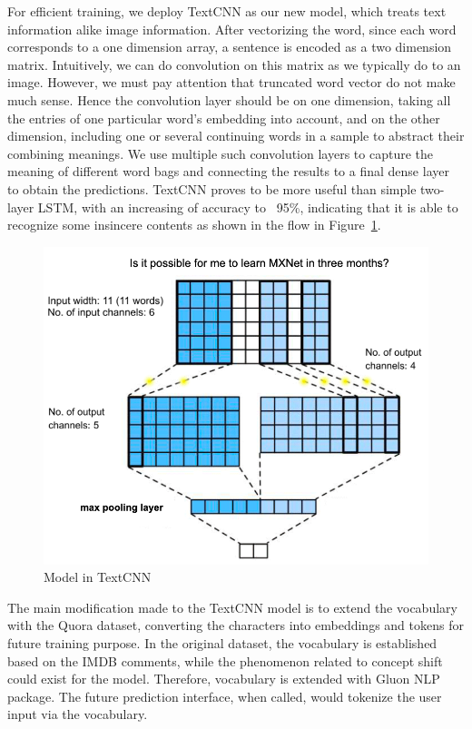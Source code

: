 \documentclass{article}
\begin{document}
For efficient training, we deploy TextCNN as our new model, which treats text information alike image information. After vectorizing the word, since each word corresponds to a one dimension array, a sentence is encoded as a two dimension matrix. Intuitively, we can do convolution on this matrix as we typically do to an image. However, we must pay attention that truncated word vector do not make much sense. Hence the convolution layer should be on one dimension, taking all the entries of one particular word's embedding into account, and on the other dimension, including one or several continuing words in a sample to abstract their combining meanings. We use multiple such convolution layers to capture the meaning of different word bags and connecting the results to a final dense layer to obtain the predictions. TextCNN proves to be more useful than simple two-layer LSTM, with an increasing of accuracy to ~95\%, indicating that it is able to recognize some insincere contents as shown in the flow in Figure~\ref{fig:flow}. 

\begin{figure}[h!]
	\centering
	\includegraphics[scale=0.4]{flow.png}
	\caption{Model in TextCNN}
	\label{fig:flow}
\end{figure}

The main modification made to the TextCNN model is to extend the vocabulary with the Quora dataset, converting the characters into embeddings and tokens for future training purpose. In the original dataset, the vocabulary is established based on the IMDB comments, while the phenomenon related to concept shift could exist for the model. Therefore, vocabulary is extended with Gluon NLP package. The future prediction interface, when called, would tokenize the user input via the vocabulary. 
\end{document}
